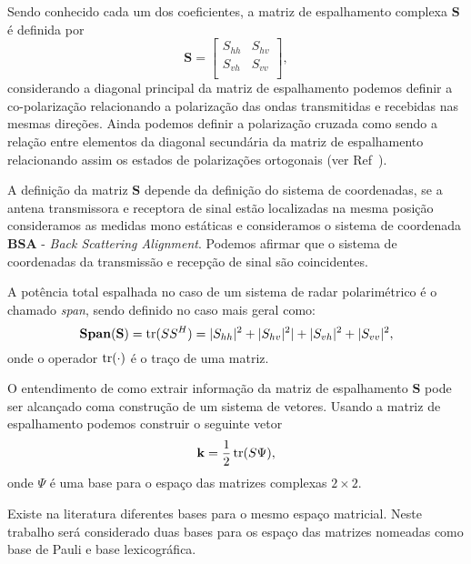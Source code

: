 Sendo conhecido cada um dos coeficientes, a matriz de espalhamento complexa $\mathbf{S}$ é definida por
\begin{equation}\label{cap_acf_2}
\mathbf{S} = \left[
\begin{array}{cc}
	S_{hh}   & S_{hv}   \\
	S_{vh}   & S_{vv}   \\
\end{array}
\right],
\end{equation}
considerando a diagonal principal da matriz de espalhamento podemos definir a co-polarização relacionando a polarização das ondas transmitidas e recebidas nas mesmas direções. Ainda podemos definir a polarização cruzada como sendo a relação entre  elementos da diagonal secundária da matriz de espalhamento relacionando assim os estados de polarizações ortogonais (ver Ref~\citet{lp}).
 
A definição da matriz $\mathbf{S}$ depende da definição do sistema de coordenadas, se a antena transmissora e receptora de sinal estão localizadas na mesma posição consideramos as medidas mono estáticas e consideramos o sistema de coordenada \textbf{BSA} - \textit{Back Scattering Alignment}. Podemos afirmar que o sistema de coordenadas da transmissão e recepção de sinal são coincidentes.   
 
A potência total espalhada no caso de um sistema de radar polarimétrico é o chamado \textit{span}, sendo definido no caso mais geral como:
\begin{equation}\label{span_geral}
\mathbf{Span(S)} = \operatorname{tr}(SS^H)=|S_{hh}|^2+|S_{hv}|^2|+|S_{vh}|^2+|S_{vv}|^2,
\end{equation}
onde o operador $\operatorname{tr}(\cdot)$ é o traço de uma matriz.

O entendimento de como extrair informação da matriz de espalhamento $\mathbf{S}$ pode ser alcançado coma construção de um sistema de vetores. Usando a matriz de espalhamento podemos construir o seguinte vetor
\begin{equation}\label{def_vet_espalhamento}
\mathbf{k}=\frac{1}{2} \operatorname{tr}(S\Psi),
\end{equation}
onde $\Psi$ é uma base para o espaço das matrizes complexas $2\times 2$.

Existe na literatura diferentes bases para o mesmo espaço matricial. Neste trabalho será considerado duas bases para os espaço das matrizes nomeadas como base de Pauli e base lexicográfica.	

